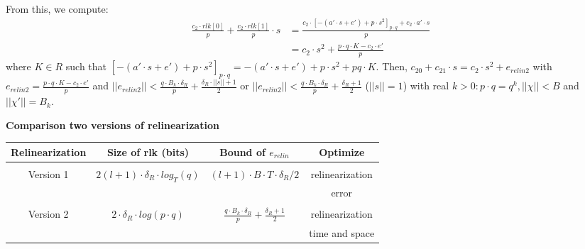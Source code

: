 \documentclass[A4paper,12pt]{article}
\begin{document}
From this, we compute:
\begin{equation*}
	\begin{aligned}
	\frac{c_2 \cdot rlk[0]}{p} + 	\frac{c_2 \cdot rlk[1]}{p} \cdot s &= \frac{c_2 \cdot [-(a' \cdot s + e') + p \cdot s^2]_{p \cdot q} + c_2 \cdot a' \cdot s}{p}\\
	&= c_2 \cdot s^2 + \frac{p \cdot q \cdot K - c_2 \cdot e'}{p}
	\end{aligned}
\end{equation*}
where $K \in R$ such that $[-(a' \cdot s + e') + p \cdot s^2]_{p \cdot q} = -(a' \cdot s + e') + p \cdot s^2 + pq \cdot K$.
Then, $c_{20} + c_{21} \cdot s = c_2 \cdot s^2 + e_{relin2}$ with $e_{relin2} = \frac{p \cdot q \cdot K - c_2 \cdot e'}{p}$ and $||e_{relin2} || < \frac{q \cdot B_k \cdot \delta_R}{p} + \frac{\delta_R \cdot ||s|| + 1}{2}$ or $||e_{relin2} || < \frac{q \cdot B_k \cdot \delta_R}{p} + \frac{\delta_R + 1}{2}$ ($||s|| = 1$) with real $k > 0: p \cdot q = q^k, ||\chi|| < B$ and $||\chi'|| = B_k$. \newline

\textbf{Comparison two versions of relinearization}



\begin{table}[ht] 
	\label{tab:tbCmpRLK1}
	\centering      %
	\begin{tabular}{c c c c}  %
		\hline\hline                        %
		Relinearization & Size of rlk (bits) & Bound of $e_{relin}$ & Optimize \\ [0.5ex] %
		\hline   \\         %
		Version 1 & $2(l + 1) \cdot \delta_R \cdot log_T(q)$ & $(l + 1) \cdot B \cdot T \cdot \delta_R / 2$  & relinearization \\&&&error \\   %
		\hline \\ 
		Version 2 & $2 \cdot \delta_R \cdot log(p \cdot q) $ &  $\frac{q \cdot B_k \cdot \delta_R}{p} + \frac{\delta_R + 1}{2}$ & relinearization \\&&&time and space \\ [1ex]       %
	
		\hline     %
	\end{tabular} 
	\label{table:nonlin}  %
\end{table}
\end{document}
